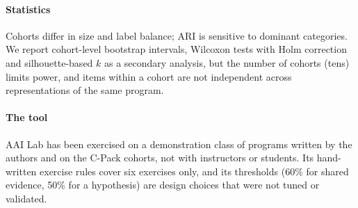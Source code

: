 \paragraph{Statistics} Cohorts differ in size and label balance; ARI is sensitive to dominant categories. We report cohort-level bootstrap intervals, Wilcoxon tests with Holm correction and silhouette-based $k$ as a secondary analysis, but the number of cohorts (tens) limits power, and items within a cohort are not independent across representations of the same program.

\paragraph{The tool} AAI Lab has been exercised on a demonstration class of programs written by the authors and on the C-Pack cohorts, not with instructors or students. Its hand-written exercise rules cover six exercises only, and its thresholds (60\% for shared evidence, 50\% for a hypothesis) are design choices that were not tuned or validated.
